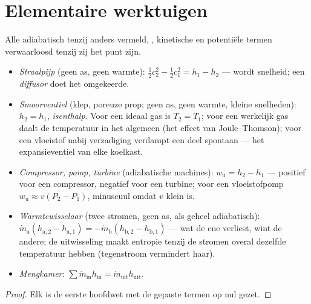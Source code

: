 \section{Elementaire werktuigen}

\begin{proposition}\label{prop:b2:open-systems:devices}
Alle adiabatisch tenzij anders vermeld, , kinetische en potentiële termen
verwaarloosd tenzij zij het punt zijn.
\begin{itemize}
\item \emph{Straalpijp} (geen as, geen warmte):
        $\tfrac12c_2^2 -
      \tfrac12c_1^2 = h_1 - h_2$ --- 
        wordt snelheid; een
      \emph{diffusor} doet het omgekeerde.
\item \emph{Smoorventiel} (klep, poreuze prop; geen as,
      geen warmte, kleine snelheden): $h_2 = h_1$, \emph{isenthalp}. Voor een
      ideaal gas is $T_2 = T_1$; voor een werkelijk gas daalt de temperatuur
      in het algemeen
      (het effect van Joule--Thomson); voor een vloeistof nabij verzadiging verdampt
      een deel spontaan --- het expansieventiel van elke koelkast.
\item \emph{Compressor, pomp, turbine} (adiabatische
      machines): $w_{\text{u}} = h_2 - h_1$ --- positief voor een compressor,
      negatief voor een turbine; voor een vloeistofpomp
      $w_{\text{u}} \approx
      v(P_2 - P_1)$, minuscuul omdat $v$ klein
      is.
\item \emph{Warmtewisselaar} (twee stromen, geen
      as, als geheel adiabatisch):
      $\dot m_{\text{a}}(h_{\text{a},2} -
      h_{\text{a},1}) = -\dot m_{\text{b}}(h_{\text{b},2} - h_{\text{b},1})$
      --- wat de ene verliest, wint de andere; de uitwisseling maakt entropie
      tenzij de stromen overal dezelfde temperatuur hebben
      (tegenstroom vermindert haar).
\item \emph{Mengkamer}:
        $\sum\dot m_{\text{in}}h_{\text{in}} = \dot
      m_{\text{uit}}h_{\text{uit}}$.
\end{itemize}
\end{proposition}

\begin{proof}
Elk is de eerste hoofdwet met de gepaste termen op nul gezet.
\end{proof}

